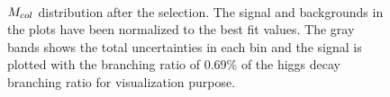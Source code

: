 \begin{figure}[htbp] 
     \centering
     \\
     \caption{ $M_{col}$ distribution after the selection. The signal and backgrounds in the plots have been normalized to the best fit values. The gray bands shows the total uncertainties in each bin and the signal is plotted with the branching ratio of 0.69\% of the higgs decay branching ratio for visualization purpose. }
     \label{fig:etaubdtbasedpostfit}
\end{figure}



